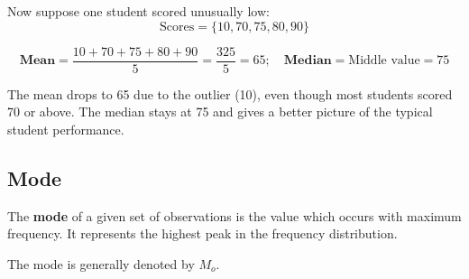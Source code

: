 \documentclass[twoside]{book}
\begin{document}
Now suppose one student scored unusually low:
\[
\text{Scores} = \{10, 70, 75, 80, 90\}
\]

\[\textbf{Mean} = \frac{10 + 70 + 75 + 80 + 90}{5} = \frac{325}{5} = 65; \quad \textbf{Median} = \text{Middle value} = 75
\]

The mean drops to 65 due to the outlier (10), even though most students scored 70 or above. The median stays at 75 and gives a better picture of the typical student performance.

\subsection{Mode}
\begin{textbox}
The \textbf{mode} of a given set of observations is the value which occurs with maximum frequency. It represents the highest peak in the frequency distribution. 
    \end{textbox}

The mode is generally denoted by \( M_o \).
\end{document}
